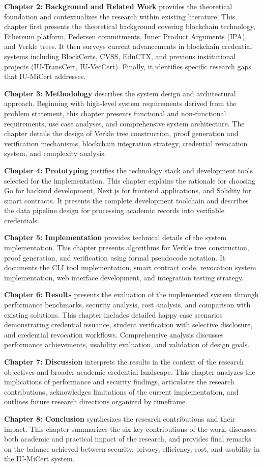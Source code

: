 \textbf{Chapter 2: Background and Related Work} provides the theoretical foundation and contextualizes the research within existing literature. This chapter first presents the theoretical background covering blockchain technology, Ethereum platform, Pedersen commitments, Inner Product Arguments (IPA), and Verkle trees. It then surveys current advancements in blockchain credential systems including BlockCerts, CVSS, EduCTX, and previous institutional projects (IU-TransCert, IU-VecCert). Finally, it identifies specific research gaps that IU-MiCert addresses.

\textbf{Chapter 3: Methodology} describes the system design and architectural approach. Beginning with high-level system requirements derived from the problem statement, this chapter presents functional and non-functional requirements, use case analyses, and comprehensive system architecture. The chapter details the design of Verkle tree construction, proof generation and verification mechanisms, blockchain integration strategy, credential revocation system, and complexity analysis.

\textbf{Chapter 4: Prototyping} justifies the technology stack and development tools selected for the implementation. This chapter explains the rationale for choosing Go for backend development, Next.js for frontend applications, and Solidity for smart contracts. It presents the complete development toolchain and describes the data pipeline design for processing academic records into verifiable credentials.

\textbf{Chapter 5: Implementation} provides technical details of the system implementation. This chapter presents algorithms for Verkle tree construction, proof generation, and verification using formal pseudocode notation. It documents the CLI tool implementation, smart contract code, revocation system implementation, web interface development, and integration testing strategy.

\textbf{Chapter 6: Results} presents the evaluation of the implemented system through performance benchmarks, security analysis, cost analysis, and comparison with existing solutions. This chapter includes detailed happy case scenarios demonstrating credential issuance, student verification with selective disclosure, and credential revocation workflows. Comprehensive analysis discusses performance achievements, usability evaluation, and validation of design goals.

\textbf{Chapter 7: Discussion} interprets the results in the context of the research objectives and broader academic credential landscape. This chapter analyzes the implications of performance and security findings, articulates the research contributions, acknowledges limitations of the current implementation, and outlines future research directions organized by timeframe.

\textbf{Chapter 8: Conclusion} synthesizes the research contributions and their impact. This chapter summarizes the six key contributions of the work, discusses both academic and practical impact of the research, and provides final remarks on the balance achieved between security, privacy, efficiency, cost, and usability in the IU-MiCert system.